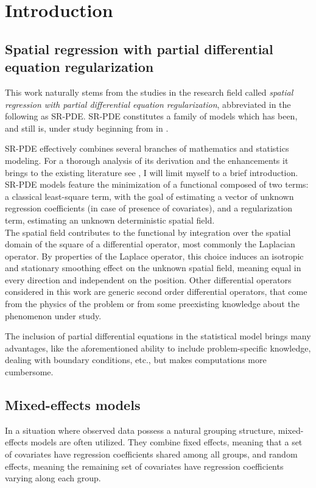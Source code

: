 \chapter{Introduction}
\label{ch:intro}

\section{Spatial regression with partial differential equation regularization}
This work naturally stems from the studies in the research field called
\textit{spatial regression with partial differential equation regularization},
abbreviated in the following as SR-PDE. SR-PDE constitutes a family of models
which has been, and still is, under study beginning from \citeyear{sangalli0}
in \citeauthor{sangalli0} \cite{sangalli0}.

SR-PDE effectively combines several branches of mathematics and statistics
modeling. For a thorough analysis of its derivation and the enhancements it
brings to the existing literature see \cite{sangalli1}, I will limit myself to
a brief introduction.\\ SR-PDE models feature the minimization of a functional
composed of two terms: a classical least-square term, with the goal of
estimating a vector of unknown regression coefficients (in case of presence of
covariates), and a regularization term, estimating an unknown deterministic
spatial field.\\ The spatial field contributes to the functional by integration
over the spatial domain of the square of a differential operator, most commonly
the Laplacian operator. By properties of the Laplace operator, this choice
induces an isotropic and stationary smoothing effect on the unknown spatial
field, meaning equal in every direction and independent on the position. Other
differential operators considered in this work are generic second order
differential operators, that come from the physics of the problem or from some
preexisting knowledge about the phenomenon under study.

The inclusion of partial differential equations in the statistical model brings
many advantages, like the aforementioned ability to include problem-specific
knowledge, dealing with boundary conditions, etc., but makes computations more
cumbersome.

\section{Mixed-effects models}
In a situation where observed data possess a natural grouping structure,
mixed-effects models are often utilized. They combine fixed effects, meaning
that a set of covariates have regression coefficients shared among all groups,
and random effects, meaning the remaining set of covariates have regression
coefficients varying along each group.

